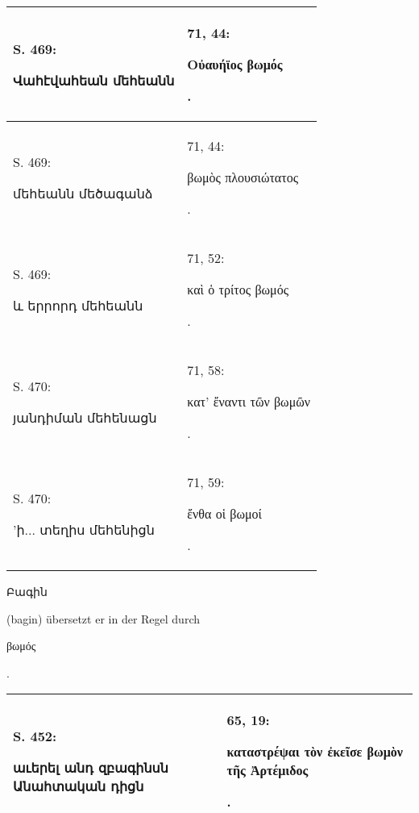 \documentclass{article}
\begin{document}
{\begin{table}[H]
\begin{tabular}{p{45mm}|p{45mm}}
        S. 469: \begin{armenian}Վահէվահեան մեհեանն\end{armenian} & 71, 44: \begin{greek}Οὐαυήϊος βωμός\end{greek}.   \\ \hline
        S. 469: \begin{armenian}մեհեանն մեծագանձ\end{armenian} & 71, 44: \begin{greek}βωμὸς πλουσιώτατος\end{greek}.   \\ \hline
        S. 469: \begin{armenian}և երրորդ մեհեանն\end{armenian} & 71, 52: \begin{greek}καὶ ὁ τρίτος βωμός\end{greek}.   \\ \hline
        S. 470: \begin{armenian}յանդիման մեհենացն\end{armenian} & 71, 58: \begin{greek}κατ' ἔναντι τῶν βωμῶν\end{greek}.   \\ \hline
        S. 470: \begin{armenian}'ի... տեղիս մեհենիցն\end{armenian} & 71, 59: \begin{greek}ἔνθα οἱ βωμοί\end{greek}. \\ \hline
    \end{tabular}
\end{table}
\hspace*{5mm}\begin{armenian}Բագին\end{armenian} (bagin) übersetzt er in der Regel durch \begin{greek}βωμός\end{greek}.  
\begin{table}[H]
    \centering
    \tiny
    \begin{tabular}{p{45mm}|p{45mm}}
    \hline
        S. 452: \begin{armenian}աւերել անդ զբագինսն Անահտական դիցն\end{armenian} & 65, 19: \begin{greek}καταστρέψαι τὸν ἐκεῖσε βωμὸν τῆς Ἀρτέμιδος\end{greek}.   \\ \hline

\end{tabular}
\end{table}}
\end{document}
